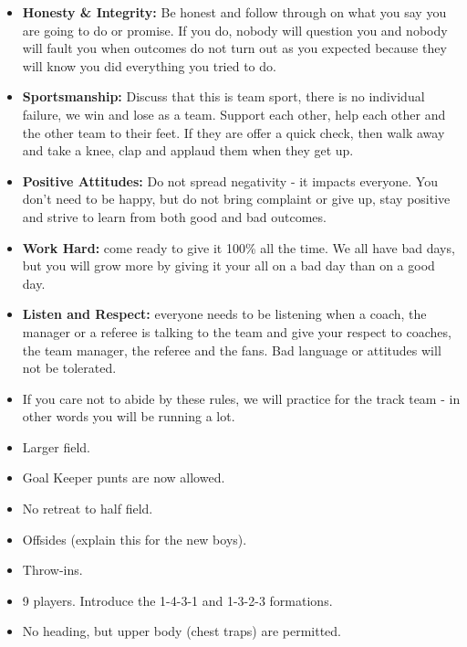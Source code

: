 \documentclass[10pt,letterpaper]{article}
\newenvironment{agendablock}[1]{%
    \tcolorbox[beamer,%
    noparskip,breakable,
    colback=LightGray,colframe=Black,%
    colbacklower=Gray!75!LightGray,%
    title=#1]}%
    {\endtcolorbox}
\newenvironment{evenBlock}[1]{%
    \tcolorbox[beamer,%
    noparskip,breakable,
    colback=LightGreen,colframe=DarkGreen,%
    colbacklower=LimeGreen!75!LightGreen,%
    title=#1]}%
    {\endtcolorbox}
\begin{document}
\begin{agendablock}{Expectations (5 min this will be covered at the parent meeting too...)}
    \begin{itemize}
        \item \textbf{Honesty \& Integrity:} Be honest and follow through on what you say you are going to do or promise.  If you do, nobody will question you and nobody will fault you when outcomes do not turn out as you expected because they will know you did everything you tried to do.
        \item \textbf{Sportsmanship:}  Discuss that this is team sport, there is no individual failure, we win and lose as a team.  Support each other, help each other and the other team to their feet.  If they are offer a quick check, then walk away and take a knee, clap and applaud them when they get up.
        \item \textbf{Positive Attitudes:} Do not spread negativity - it impacts everyone.  You don't need to be happy, but do not bring complaint or give up, stay positive and strive to learn from both good and bad outcomes.
        \item \textbf{Work Hard:} come ready to give it 100\% all the time.  We all have bad days, but you will grow more by giving it your all on a bad day than on a good day.
        \item \textbf{Listen and Respect:} everyone needs to be listening when a coach, the manager or a referee is talking to the team and give your respect to coaches, the team manager, the referee and the fans.  Bad language or attitudes will not be tolerated.
        \item If you care not to abide by these rules, we will practice for the track team - in other words you will be running a lot.
    \end{itemize}
\end{agendablock}

\begin{evenBlock}{U11 Rules (2 min)}
    \begin{itemize}
        \item Larger field.
        \item Goal Keeper punts are now allowed.
        \item No retreat to half field.
        \item Offsides (explain this for the new boys).
        \item Throw-ins.
        \item 9 players.  Introduce the 1-4-3-1  and 1-3-2-3 formations.
        \item No heading, but upper body (chest traps) are permitted.
    \end{itemize}
\end{evenBlock}
\end{document}
